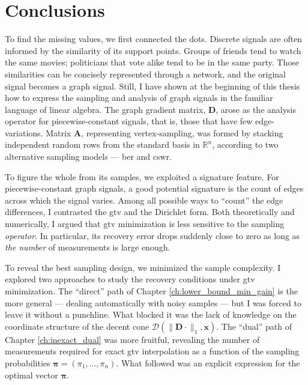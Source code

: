 \chapter{Conclusions}


To find the missing values, we first connected the dots. Discrete signals are often informed by the similarity of its support points. Groups of friends tend to watch the same movies; politicians that vote alike tend to be in the same party. Those similarities can be concisely represented through a network, and the original signal becomes a graph signal. Still, I have shown at the beginning of this thesis how to express the sampling and analysis of graph signals in the familiar language of linear algebra. The graph gradient matrix, $\mathbf{D}$, arose as the analysis operator for piecewise-constant signals, that is, those that have few edge-variations. Matrix $\mathbf{A}$, representing vertex-sampling, was formed by stacking independent random rows from the standard basis in $\mathbb{R}^{n}$, according to two alternative sampling models --- \acrshort{ber} and \acrshort{cswr}.

To figure the whole from its samples, we exploited a signature feature. For piecewise-constant graph signals, a good potential signature is the count of edges across which the signal varies. Among all possible ways to ``count'' the edge differences, I contrasted the \acrfull{gtv} and the Dirichlet form. Both theoretically and numerically, I argued that \acrshort{gtv} minimization is less sensitive to the sampling \emph{operator}. In particular, its recovery error drops suddenly close to zero as long as \emph{the number} of measurements is large enough.

To reveal the best sampling design, we minimized the sample complexity. I explored two approaches to study the recovery conditions under \acrshort{gtv} minimization. The ``direct'' path of Chapter \ref{ch:lower_bound_min_gain} is the more general --- dealing automatically with noisy samples --- but I was forced to leave it without a punchline. What blocked it was the lack of knowledge on the coordinate structure of the decent cone $\mathcal{D} \left ( \|\mathbf{D} \cdot\|_1 , \mathbf{x} \right )$. The ``dual'' path of Chapter \ref{ch:inexact_dual} was more fruitful, revealing the number of measurements required for exact \acrshort{gtv} interpolation as a function of the sampling probabilities $\bm{\pi} =(\pi_1, \dots, \pi_n)$. What followed was an explicit expression for the optimal vector $\bm{\pi}$.

